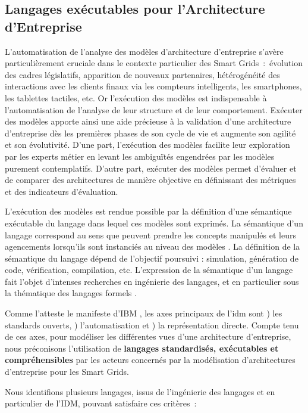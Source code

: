 \subsection{Langages exécutables pour l'Architecture d'Entreprise}

L'automatisation de l'analyse des modèles d'architecture d'entreprise s'avère particulièrement cruciale dans le contexte particulier des Smart Grids~:~évolution des cadres législatifs,  apparition de nouveaux partenaires, hétérogénéité des interactions avec les clients finaux via les compteurs intelligents, les smartphones, les tablettes tactiles, etc. Or l'exécution des modèles est indispensable à l'automatisation de l'analyse de leur structure et de leur comportement. Exécuter des modèles apporte ainsi une aide précieuse à la validation d'une architecture d'entreprise dès les premières phases de son cycle de vie et augmente son agilité et son évolutivité. D'une part, l'exécution des modèles facilite leur exploration  par les experts métier en levant les ambiguïtés engendrées par les modèles purement contemplatifs. D'autre part, exécuter des modèles permet d'évaluer et de comparer des architectures de manière objective en définissant des métriques et des indicateurs d'évaluation. 

L'exécution des modèles est rendue possible par la définition d'une sémantique exécutable du langage dans lequel ces modèles sont exprimés. La sémantique d'un langage correspond au sens que peuvent prendre les concepts manipulés et leurs agencements lorsqu'ils sont instanciés au niveau des modèles \cite{jezequel2012ingenierie}. La définition de la sémantique du langage dépend de l'objectif poursuivi : simulation, génération de code, vérification, compilation, etc. L'expression de la sémantique d'un langage fait l'objet d'intenses recherches en ingénierie des langages, et en particulier sous la thématique des langages formels \cite{kleppe2007language}. 

Comme l'atteste le manifeste d'IBM \cite{chesbrough2006research}, les axes principaux de l'\gls{idm} sont \primo\!) les standards ouverts, \secundo\!) l'automatisation et \tertio\!) la représentation directe. Compte tenu de ces axes, pour modéliser les différentes vues d'une architecture d'entreprise, nous préconisons l'utilisation de \textbf{langages standardisés, exécutables et compréhensibles} par les acteurs concernés par la modélisation d'architectures d'entreprise pour les Smart Grids. 

Nous identifions plusieurs langages, issus de l'ingénierie des langages et en particulier de l'IDM, pouvant satisfaire ces critères~:

